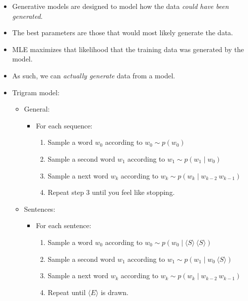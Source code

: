 \documentclass[11pt,letterpaper]{article}
\newcommand{\ngramstart}{\ensuremath{\langle S \rangle}}
\newcommand{\ngramend}{\ensuremath{\langle E \rangle}}
\begin{document}
\begin{itemize}
  \item Generative models are designed to model how the data \textit{could have been generated}.
  \item The best parameters are those that would most likely generate the data.
  \item MLE maximizes that likelihood that the training data was generated by the model.
  \item As such, we can \textit{actually generate} data from a model.
 
  \item Trigram model:
    \begin{itemize}
      \item General:
        \begin{itemize}
          \item[] \hspace{-4mm} For each sequence:
            \begin{enumerate}
              \item Sample a word $w_0$ according to $w_0 \sim p(w_0)$
              \item Sample a second word $w_1$ according to $w_1 \sim p(w_1 \mid w_0)$
              \item Sample a next word $w_k$ according to $w_k \sim p(w_k \mid w_{k-2}~w_{k-1})$
              \item Repeat step 3 until you feel like stopping.
            \end{enumerate}
        \end{itemize}
      \item Sentences:
        \begin{itemize}
          \item[] \hspace{-4mm} For each sentence:
            \begin{enumerate}
              \item Sample a word $w_0$ according to $w_0 \sim p(w_0 \mid \ngramstart~\ngramstart)$
              \item Sample a second word $w_1$ according to $w_1 \sim p(w_1 \mid w_0~\ngramstart)$
              \item Sample a next word $w_k$ according to $w_k \sim p(w_k \mid w_{k-2}~w_{k-1})$
              \item Repeat until $\ngramend$ is drawn.
            \end{enumerate}
        \end{itemize}
    \end{itemize}


\end{itemize}
\end{document}

